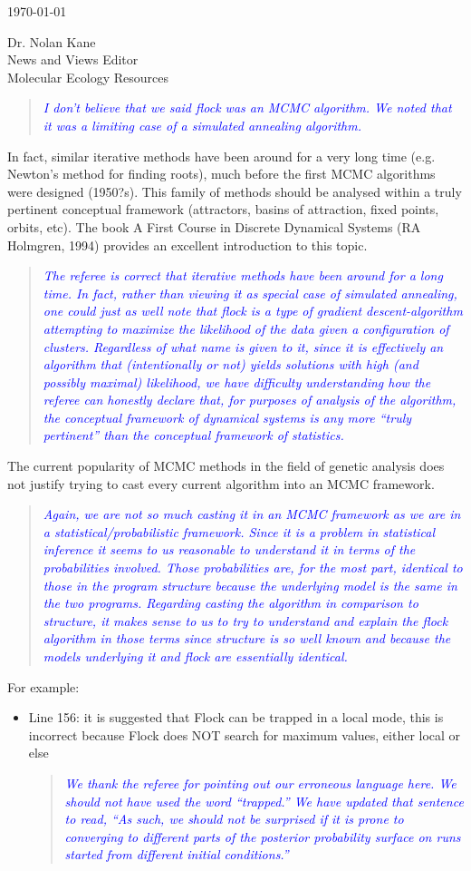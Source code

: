 \documentclass[11pt]{letter}
\newcommand{\reply}[1]{\begin{quotation}\small\sl\textcolor{blue}{#1}\end{quotation}}
\begin{document}
\begin{letter}{ \today 

Dr. Nolan Kane\\
News and Views Editor\\
Molecular Ecology Resources \\
}
\reply{I don't believe that we said {\sc flock} was an MCMC algorithm.  We noted that it was a limiting
 case of a simulated annealing algorithm.}

In fact, similar iterative methods have been around for a very long time (e.g. Newton's method for finding roots), much before the first MCMC algorithms were designed (1950?s). This family of methods should be analysed within a truly pertinent conceptual framework (attractors, basins of attraction, fixed points, orbits, etc). The book A First Course in Discrete Dynamical Systems (RA Holmgren, 1994) provides an excellent introduction to this topic. 
\reply{The referee is correct that iterative methods have been around for a long time.
In fact, rather than viewing it as special case of simulated annealing, one could just as well
note that {\sc flock} is a type of gradient descent-algorithm attempting to maximize the
likelihood of the data given a configuration of clusters.
Regardless of what name is given to it, since it is effectively an algorithm
that (intentionally or not) yields solutions with 
high (and possibly maximal) likelihood, we have difficulty understanding
how the referee can honestly declare that, for purposes of analysis of the algorithm,
the conceptual framework of dynamical systems is any more ``truly pertinent'' than
the conceptual framework of statistics.   }


The current popularity of MCMC methods in the field of genetic analysis does not justify trying to cast every current algorithm into an MCMC framework.

\reply{Again, we are not so much casting it in an MCMC framework as we are in a 
statistical/probabilistic framework.  Since it is a problem in statistical inference
it seems to us reasonable to understand it in terms of the probabilities involved. Those
probabilities are, for the most part, identical to those in the program {\sc structure} because
the underlying model is the same in the two programs.  Regarding casting the algorithm in
comparison to {\sc structure}, it makes sense to us to try to understand and explain the {\sc flock}
algorithm in those terms since {\sc structure} is so well known and because the models
underlying it and {\sc flock} are essentially identical.  }

For example:
\begin{itemize}
\item Line 156: it is suggested that Flock can be trapped in a local mode, this is incorrect because Flock does NOT search for maximum values, either local or else
\reply{We thank the referee for pointing out our erroneous language here.  We should not have used
the word ``trapped.''  We have updated that sentence to read, ``As such, we should not be surprised
if it is prone 
to converging to different parts of the posterior probability surface on runs started
from different initial conditions.''}


\end{itemize}
\end{letter}
\end{document}
